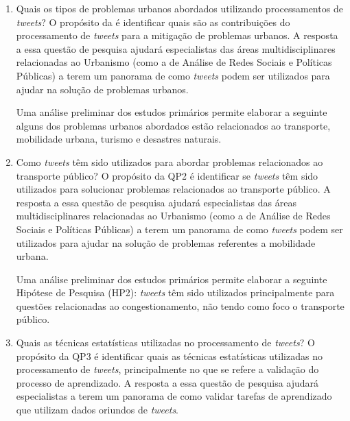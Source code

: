 \documentclass[
	12pt,				%
	oneside,			%
	a4paper,			%
	english,			%
	brazil				%
	]{abntex2ppgsi}
\begin{document}
{{{\begin{enumerate}

\item Quais os tipos de problemas urbanos abordados utilizando processamentos de \textit{tweets}?
\label{item:1} \newline \newline
O propósito da  é identificar quais são as contribuições do processamento de \textit{tweets} para a mitigação de problemas urbanos. A resposta a essa questão de pesquisa ajudará especialistas das áreas multidisciplinares relacionadas ao Urbanismo (como a de Análise de Redes Sociais e Políticas Públicas) a terem um panorama de como \textit{tweets} podem ser utilizados para ajudar na solução de problemas urbanos. \newline

Uma análise preliminar dos estudos primários permite elaborar a seguinte  alguns dos problemas urbanos abordados estão relacionados ao transporte, mobilidade urbana, turismo e desastres naturais. \newline

\item Como \textit{tweets} têm sido utilizados para abordar problemas relacionados ao transporte público? \newline \newline
\label{item:2}
O propósito da QP2 é identificar se \textit{tweets} têm sido utilizados para solucionar problemas relacionados ao transporte público. A resposta a essa questão de pesquisa ajudará especialistas das áreas multidisciplinares relacionadas ao Urbanismo (como a de Análise de Redes Sociais e Políticas Públicas) a terem um panorama de como \textit{tweets} podem ser utilizados para ajudar na solução de problemas referentes a mobilidade urbana. \newline

Uma análise preliminar dos estudos primários permite elaborar a seguinte Hipótese de Pesquisa (HP2): \textit{tweets} têm sido utilizados principalmente para questões relacionadas ao congestionamento, não tendo como foco o transporte público.\newline

\item Quais as técnicas estatísticas utilizadas no processamento de \textit{tweets}?
\label{item:3} \newline \newline
O propósito da QP3 é identificar quais as técnicas estatísticas utilizadas no processamento de \textit{tweets}, principalmente no que se refere a validação do processo de aprendizado. A resposta a essa questão de pesquisa ajudará especialistas a terem um panorama de como validar tarefas de aprendizado que utilizam dados oriundos de \textit{tweets}. \newline


\end{enumerate}}}}
\end{document}
